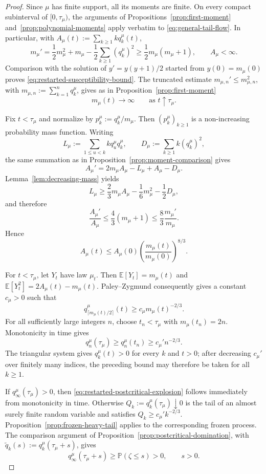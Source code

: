 \documentclass[11pt,a4paper]{amsart}
\theoremstyle{remark}
\begin{document}
\begin{proof}
Since $\mu$ has finite support, all its moments are finite. On every
compact subinterval of $[0,\tau_\mu)$, the arguments of
Propositions~\ref{prop:first-moment} and~\ref{prop:polynomial-moments}
apply verbatim to \eqref{eq:general-tail-flow}. In particular, with
$A_\mu(t):=\sum_{k\geq1}kq_k^\mu(t)$,
\[
        m_\mu'
        =
        \frac12m_\mu^2+m_\mu
        -\frac12\sum_{k\geq1}(q_k^\mu)^2
        \geq\frac12m_\mu(m_\mu+1),
        \qquad
        A_\mu<\infty.
\]
Comparison with the solution of $y'=y(y+1)/2$ started from
$y(0)=m_\mu(0)$ proves
\eqref{eq:restarted-susceptibility-bound}. The truncated estimate
$m_{\mu,n}'\leq m_{\mu,n}^2$, with
$m_{\mu,n}:=\sum_{k=1}^nq_k^\mu$, gives as in
Proposition~\ref{prop:first-moment}
\[
        m_\mu(t)\longrightarrow\infty
        \qquad\text{as }t\uparrow\tau_\mu.
\]

Fix $t<\tau_\mu$ and normalize by
$p_k^\mu:=q_k^\mu/m_\mu$. Then $(p_k^\mu)_{k\geq1}$ is a non-increasing
probability mass function. Writing
\[
        L_\mu:=\sum_{1\leq u<k}kq_u^\mu q_k^\mu,
        \qquad
        D_\mu:=\sum_{k\geq1}k(q_k^\mu)^2,
\]
the same summation as in Proposition~\ref{prop:moment-comparison} gives
\[
        A_\mu'=2m_\mu A_\mu-L_\mu+A_\mu-D_\mu.
\]
Lemma~\ref{lem:decreasing-mass} yields
\[
        L_\mu
        \geq
        \frac23m_\mu A_\mu-\frac16m_\mu^2-\frac12D_\mu,
\]
and therefore
\[
        \frac{A_\mu'}{A_\mu}
        \leq\frac43(m_\mu+1)
        \leq\frac83\frac{m_\mu'}{m_\mu}.
\]
Hence
\[
        A_\mu(t)
        \leq
        A_\mu(0)
        \left(\frac{m_\mu(t)}{m_\mu(0)}\right)^{8/3}.
\]

For $t<\tau_\mu$, let $Y_t$ have law $\mu_t$. Then
$\mathbb E[Y_t]=m_\mu(t)$ and
$\mathbb E[Y_t^2]=2A_\mu(t)-m_\mu(t)$. Paley--Zygmund consequently gives
a constant $c_\mu>0$ such that
\[
        q_{\lceil m_\mu(t)/2\rceil}^\mu(t)
        \geq c_\mu m_\mu(t)^{-2/3}.
\]
For all sufficiently large integers $n$, choose
$t_n<\tau_\mu$ with $m_\mu(t_n)=2n$. Monotonicity in time gives
\[
        q_n^\mu(\tau_\mu)
        \geq q_n^\mu(t_n)
        \geq c_\mu' n^{-2/3}.
\]
The triangular system gives $q_k^\mu(t)>0$ for every $k$ and $t>0$;
after decreasing $c_\mu'$ over finitely many indices, the preceding
bound may therefore be taken for all $k\geq1$.

If $q_\infty^\mu(\tau_\mu)>0$, then
\eqref{eq:restarted-postcritical-explosion} follows immediately from
monotonicity in time. Otherwise
$Q_k:=q_k^\mu(\tau_\mu)\downarrow0$ is the tail of an almost surely finite
random variable and satisfies $Q_k\geq c_\mu'k^{-2/3}$.
Proposition~\ref{prop:frozen-heavy-tail} applies to the corresponding
frozen process. The comparison argument of
Proposition~\ref{prop:postcritical-domination}, with
$\widetilde q_k(s):=q_k^\mu(\tau_\mu+s)$, gives
\[
        q_\infty^\mu(\tau_\mu+s)
        \geq\mathbb P(\zeta\leq s)>0,
        \qquad s>0.
\]
\end{proof}
\end{document}
